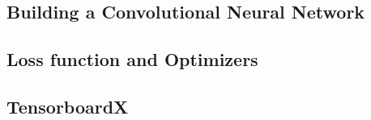 \subsection{Building a Convolutional Neural Network}



\subsection{Loss function and Optimizers}



\subsection{TensorboardX}


